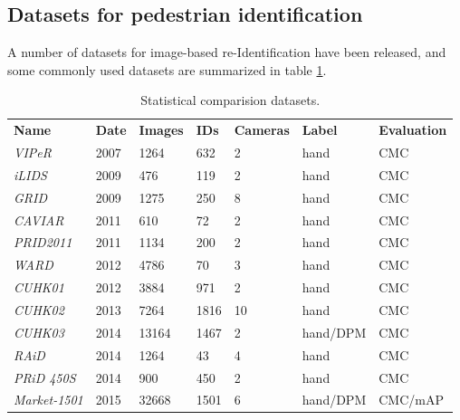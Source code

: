 \documentclass[12pt, a4paper, titlepage,twoside,openright]{article}
\begin{document}
\subsection{Datasets for pedestrian identification}

A number of datasets for image-based re-Identification have been released, and some commonly used datasets are summarized in table \ref{tableID}. 


\begin{table}[]
\centering

\begin{tabular}{lllllll}
\textbf{Name}        & \textbf{Date} & \textbf{Images} & \textbf{IDs} & \textbf{Cameras} & \textbf{Label} & \textbf{Evaluation} \\
\textit{VIPeR} \cite{viper}      & 2007          & 1264                      & 632          & 2                & hand           & CMC                 \\
\textit{iLIDS}  \cite{lids}      & 2009          & 476                       & 119          & 2                & hand           & CMC                 \\
\textit{GRID}   \cite{grid}     & 2009          & 1275                      & 250          & 8                & hand           & CMC                 \\
\textit{CAVIAR} \cite{caviar}      & 2011          & 610                       & 72           & 2                & hand           & CMC                 \\
\textit{PRID2011} \cite{prod11}   & 2011          & 1134                      & 200          & 2                & hand           & CMC                 \\
\textit{WARD}   \cite{ward}     & 2012          & 4786                      & 70           & 3                & hand           & CMC                 \\
\textit{CUHK01} \cite{cuk1}     & 2012          & 3884                      & 971          & 2                & hand           & CMC                 \\
\textit{CUHK02}  \cite{cuk2}    & 2013          & 7264                      & 1816         & 10               & hand           & CMC                 \\
\textit{CUHK03}  \cite{cuk3}    & 2014          & 13164                     & 1467         & 2                & hand/DPM       & CMC                 \\
\textit{RAiD}  \cite{raid}      & 2014          & 1264                      & 43           & 4                & hand           & CMC                 \\
\textit{PRiD 450S} \cite{prid450}   & 2014          & 900                       & 450          & 2                & hand           & CMC                 \\
\textit{Market-1501} \cite{market} & 2015          & 32668                     & 1501         & 6                & hand/DPM       & CMC/mAP            
\end{tabular}
\caption{Statistical comparision datasets.}
\label{tableID}
\end{table}
\end{document}
